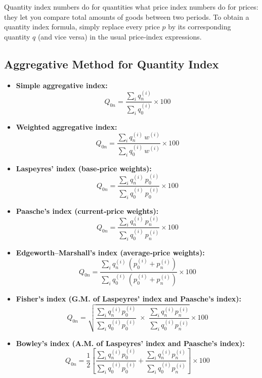 \documentclass[twoside]{book}
\begin{document}
Quantity index numbers do for quantities what price index numbers do for prices: they let you compare total amounts of goods between two periods. To obtain a quantity index formula, simply replace every price \(p\) by its corresponding quantity \(q\) (and vice versa) in the usual price‐index expressions.

\subsection{Aggregative Method for Quantity Index}

\begin{itemize}
    \item \textbf{Simple aggregative index:}
    $$
    Q_{0n} = \frac{\displaystyle\sum_i q_n^{(i)}}{\displaystyle\sum_i q_0^{(i)}} \times 100
    $$

    \item \textbf{Weighted aggregative index:}
    $$
    Q_{0n} = \frac{\displaystyle\sum_i q_n^{(i)}\,w^{(i)}}{\displaystyle\sum_i q_0^{(i)}\,w^{(i)}} \times 100
    $$

    \item \textbf{Laspeyres' index (base‐price weights):}
    $$
    Q_{0n} = \frac{\displaystyle\sum_i q_n^{(i)}\,p_0^{(i)}}{\displaystyle\sum_i q_0^{(i)}\,p_0^{(i)}} \times 100
    $$

    \item \textbf{Paasche's index (current‐price weights):}
    $$
    Q_{0n} = \frac{\displaystyle\sum_i q_n^{(i)}\,p_n^{(i)}}{\displaystyle\sum_i q_0^{(i)}\,p_n^{(i)}} \times 100
    $$

    \item \textbf{Edgeworth–Marshall's index (average‐price weights):}
    $$
    Q_{0n} = \frac{\displaystyle\sum_i q_n^{(i)}\,(p_0^{(i)} + p_n^{(i)})}{\displaystyle\sum_i q_0^{(i)}\,(p_0^{(i)} + p_n^{(i)})} \times 100
    $$

    \item \textbf{Fisher's index (G.M. of Laspeyres' index and Paasche's index):}
    $$
    Q_{0n} = \sqrt{
      \frac{\displaystyle\sum_i q_n^{(i)}p_0^{(i)}}{\displaystyle\sum_i q_0^{(i)}p_0^{(i)}}
      \;\times\;
      \frac{\displaystyle\sum_i q_n^{(i)}p_n^{(i)}}{\displaystyle\sum_i q_0^{(i)}p_n^{(i)}}
    } \times 100
    $$

    \item \textbf{Bowley's index (A.M. of Laspeyres' index and Paasche's index):}
    $$
    Q_{0n} = \frac12 \left[
      \frac{\displaystyle\sum_i q_n^{(i)}p_0^{(i)}}{\displaystyle\sum_i q_0^{(i)}p_0^{(i)}} +
      \frac{\displaystyle\sum_i q_n^{(i)}p_n^{(i)}}{\displaystyle\sum_i q_0^{(i)}p_n^{(i)}}
    \right] \times 100
    $$


\end{itemize}
\end{document}
